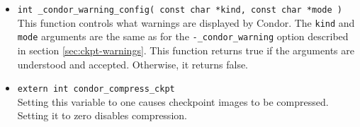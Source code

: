 \begin{itemize}
\item \verb$int _condor_warning_config( const char *kind, const char *mode )$\\
This function controls what warnings are displayed by Condor.
The \verb$kind$ and \verb$mode$ arguments are the same as for the
\verb$-_condor_warning$ option described in section \ref{sec:ckpt-warnings}.  This function returns true
if the arguments are understood and accepted.  Otherwise, it returns false.

\item \verb$extern int condor_compress_ckpt$\\
Setting this variable to one causes checkpoint images to be compressed.
Setting it to zero disables compression.

\end{itemize}

